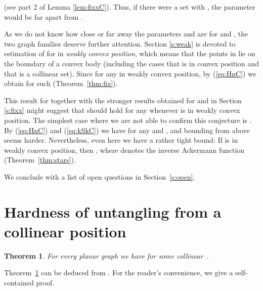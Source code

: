 \documentclass[reqno,12pt]{amsart}
\newtheorem{theorem}{Theorem}[section]
\newcommand{\refeq}[1]{(\ref{eq:#1})}
\begin{document}
(see part 2 of Lemma \ref{lem:fixxC}).
Thus, if there were a set  with , the parameter 
would be far apart from .

As we do not know how close or far away the parameters  and  are
for  and , the two graph families deserve further attention.
Section \ref{s:weak} is devoted to estimation of  for  in
\emph{weakly convex position}, which means that the points in 
lie on the boundary of a convex body (including the cases that 
is in convex position and that  is a collinear set). Since
 for any  in weakly convex position, by \refeq{HnC} we
obtain  for such  (Theorem~\ref{thm:fix}). 


This result for  together with the stronger results obtained for
 and  in Section \ref{s:fixx} might suggest
that  should hold for any  whenever  is in weakly convex position.
The simplest case where we are not able to confirm this conjecture is .
By \refeq{HnC} and \refeq{kSkC} we have  for any  and ,
and bounding  from above seems harder.
Nevertheless, even here we have a rather tight bound: 
If  is in weakly convex position, then
, where 
denotes the inverse Ackermann function (Theorem~\ref{thm:stars}).


We conclude with a list of open questions in Section~\ref{s:open}. 


\section{Hardness of untangling from a collinear position}\label{s:collin}


\begin{theorem}\label{thm:fixlfix}
For every planar graph  we have  for some collinear~.
\end{theorem}
Theorem~\ref{thm:fixlfix} can
be deduced from \cite[Lemma 1]{Bose}. For the reader's convenience,
we give a self-contained proof.
\end{document}
